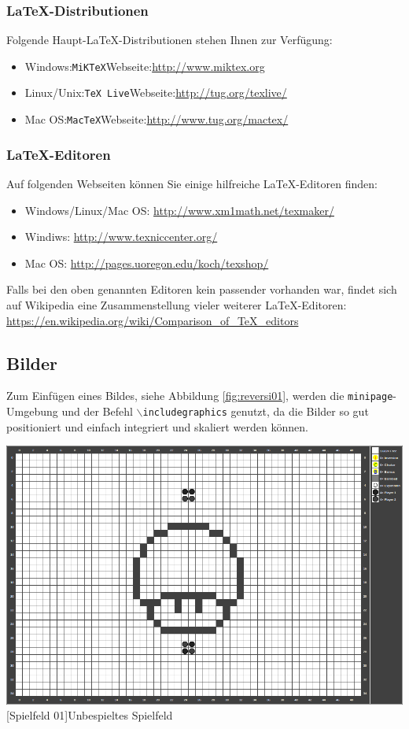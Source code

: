 \documentclass[12pt,a4paper,bibliography=totocnumbered,listof=totocnumbered]{article}
\begin{document}
\subsubsection{\LaTeX-Distributionen}
Folgende Haupt-\LaTeX-Distributionen stehen Ihnen zur Verfügung:
\begin{itemize}
  \item Windows:\quad \texttt{MiKTeX}\quad Webseite:\quad\url{http://www.miktex.org}
  \item Linux/Unix:\quad \texttt{TeX Live}\quad Webseite:\quad\url{http://tug.org/texlive/}
  \item Mac OS:\quad \texttt{MacTeX}\quad Webseite:\quad\url{http://www.tug.org/mactex/}
\end{itemize}

\subsubsection{\LaTeX-Editoren}
Auf folgenden Webseiten können Sie einige hilfreiche \LaTeX-Editoren finden:
\begin{itemize}
  \item Windows/Linux/Mac OS: \url{http://www.xm1math.net/texmaker/}
  \item Windiws: \url{http://www.texniccenter.org/}
  \item Mac OS: \url{http://pages.uoregon.edu/koch/texshop/}
\end{itemize}

Falls bei den oben genannten Editoren kein passender vorhanden war, findet sich auf Wikipedia eine Zusammenstellung vieler weiterer \LaTeX-Editoren:\\[1em]
\hspace*{3cm}\url{https://en.wikipedia.org/wiki/Comparison_of_TeX_editors}


\subsection{Bilder}
Zum Einfügen eines Bildes, siehe Abbildung \ref{fig:reversi01}, werden die \texttt{minipage}-Umgebung und der Befehl \texttt{$\backslash$includegraphics} genutzt, da die Bilder so gut positioniert und einfach integriert und skaliert werden können.

\vspace{1em}
\begin{minipage}{\linewidth}
	\centering
	\includegraphics[width=0.5\linewidth]{pics/gamefield01.png}
	[Spielfeld 01]{Unbespieltes Spielfeld\footnotemark }
	\label{fig:reversi01}
\end{minipage}
\end{document}
